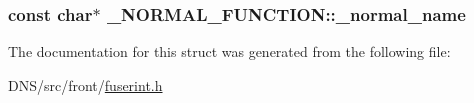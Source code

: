 \subsubsection[{\texorpdfstring{\+\_\+normal\+\_\+name}{_normal_name}}]{\setlength{\rightskip}{0pt plus 5cm}const char$\ast$ \+\_\+\+N\+O\+R\+M\+A\+L\+\_\+\+F\+U\+N\+C\+T\+I\+O\+N\+::\+\_\+normal\+\_\+name}\hypertarget{struct___n_o_r_m_a_l___f_u_n_c_t_i_o_n_aa6efac643e00ad3aa6c448d2efb03103}{}\label{struct___n_o_r_m_a_l___f_u_n_c_t_i_o_n_aa6efac643e00ad3aa6c448d2efb03103}


The documentation for this struct was generated from the following file\+:\begin{DoxyCompactItemize}
\item 
D\+N\+S/src/front/\hyperlink{fuserint_8h}{fuserint.\+h}\end{DoxyCompactItemize}
